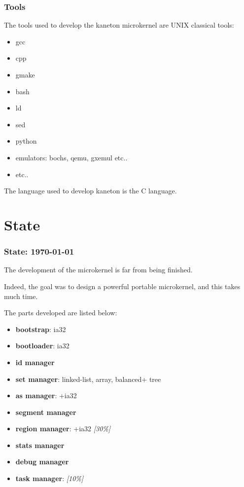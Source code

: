 {%

\begin{frame}
  \frametitle{Tools}

  The tools used to develop the kaneton microkernel are UNIX classical tools:

  \begin{itemize}
    \item
      gcc
    \item
      cpp
    \item
      gmake
    \item
      bash
    \item
      ld
    \item
      sed
    \item
      python
    \item
      emulators: bochs, qemu, gxemul etc..
    \item
      etc..
  \end{itemize}

  \nl

  The language used to develop kaneton is the C language.
\end{frame}

%
%

\section{State}


\begin{frame}
  \frametitle{State: \textbf{\today}}

  The development of the microkernel is far from being finished.

  \nl

  Indeed, the goal was to design a powerful portable microkernel, and this
  takes much time.

  \nl

  The parts developed are listed below:

  \begin{itemize}[<+->]
    \item
      \textbf{bootstrap}: ia32
    \item
      \textbf{bootloader}: ia32
    \item
      \textbf{id manager}
    \item
      \textbf{set manager}: linked-list, array, balanced+ tree
    \item
      \textbf{as manager}: +ia32
    \item
      \textbf{segment manager}
    \item
      \textbf{region manager}: +ia32 \textit{[30\%]}
    \item
      \textbf{stats manager}
    \item
      \textbf{debug manager}
    \item
      \textbf{task manager}: \textit{[10\%]}
  \end{itemize}
\end{frame}

}
